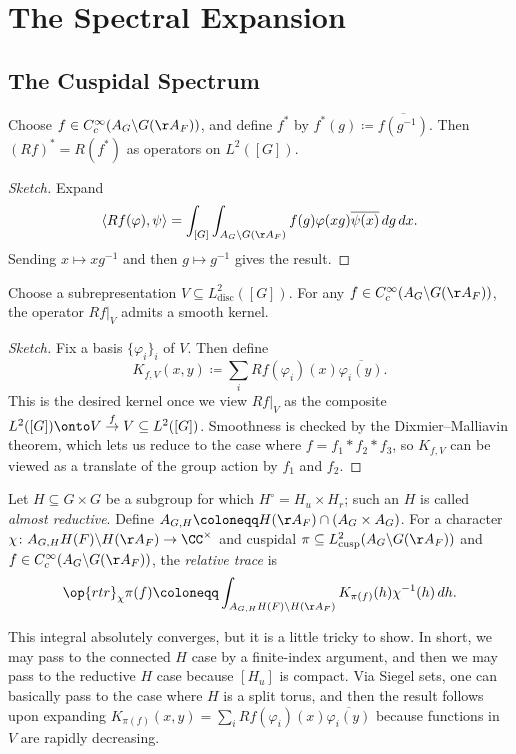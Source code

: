 \documentclass{article}
\begin{document}
\section{The Spectral Expansion}

\subsection{The Cuspidal Spectrum}
\begin{lemma}
	Choose $f\in C_c^\infty(A_G\backslash G(\AA_F))$, and define $f^*$ by $f^*(g)\coloneqq\overline{f\left(g^{-1}\right)}$. Then $(Rf)^*=R(f^*)$ as operators on $L^2([G])$.
\end{lemma}
\begin{proof}[Sketch]
	Expand
	\[\langle Rf(\varphi),\psi\rangle=\int_{[G]}\int_{A_G\backslash G(\AA_F)}f(g)\varphi(xg)\overline{\psi(x)}\,dg\,dx.\]
	Sending $x\mapsto xg^{-1}$ and then $g\mapsto g^{-1}$ gives the result.
\end{proof}
\begin{proposition}
	Choose a subrepresentation $V\subseteq L^2_{\mathrm{disc}}([G])$. For any $f\in C_c^\infty(A_G\backslash G(\AA_F))$, the operator $Rf|_V$ admits a smooth kernel.
\end{proposition}
\begin{proof}[Sketch]
	Fix a basis $\{\varphi_i\}_i$ of $V$. Then define
	\[K_{f,V}(x,y)\coloneqq\sum_iRf(\varphi_i)(x)\overline{\varphi_i(y)}.\]
	This is the desired kernel once we view $Rf|_V$ as the composite $L^2([G])\onto V\stackrel f\to V\subseteq L^2([G])$. Smoothness is checked by the Dixmier--Malliavin theorem, which lets us reduce to the case where $f=f_1*f_2*f_3$, so $K_{f,V}$ can be viewed as a translate of the group action by $f_1$ and $f_2$.
\end{proof}
\begin{definition}
	Let $H\subseteq G\times G$ be a subgroup for which $H^\circ=H_u\times H_r$; such an $H$ is called \textit{almost reductive}. Define $A_{G,H}\coloneqq H(\AA_F)\cap(A_G\times A_G)$. For a character $\chi\colon A_{G,H}H(F)\backslash H(\AA_F)\to\CC^\times$ and cuspidal $\pi\subseteq L^2_{\mathrm{cusp}}(A_G\backslash G(\AA_F))$ and $f\in C_c^\infty(A_G\backslash G(\AA_F))$, the \textit{relative trace} is
	\[\op{rtr}_\chi\pi(f)\coloneqq\int_{A_{G,H}H(F)\backslash H(\AA_F)}K_{\pi(f)}(h)\chi^{-1}(h)\,dh.\]
\end{definition}
\begin{remark}
	This integral absolutely converges, but it is a little tricky to show. In short, we may pass to the connected $H$ case by a finite-index argument, and then we may pass to the reductive $H$ case because $[H_u]$ is compact. Via Siegel sets, one can basically pass to the case where $H$ is a split torus, and then the result follows upon expanding $K_{\pi(f)}(x,y)=\sum_iRf(\varphi_i)(x)\overline{\varphi_i(y)}$ because functions in $V$ are rapidly decreasing.
\end{remark}
\end{document}
